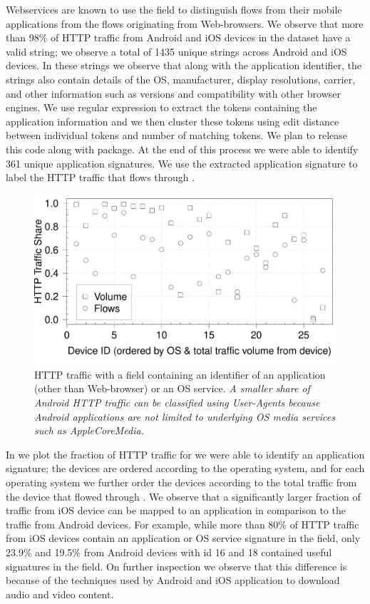 Webservices are known to use the \useragent field to distinguish flows from their mobile applications from the flows originating from Web-browsers.
We observe that more than 98\% of HTTP traffic from Android and iOS devices in the \mobWild dataset have a valid \useragent string; we observe a total of 1435 unique \useragent strings across Android and iOS devices. 
In these \useragent strings we observe that along with the application identifier, the \useragent strings also contain details of the OS, manufacturer, display resolutions, carrier, and other information such as versions and compatibility with other browser engines. 
We use regular expression to extract the tokens containing the application information and we then cluster these tokens using edit distance between individual tokens and number of matching tokens. 
We plan to release this code along with \platname package.
At the end of this process we were able to identify 361 unique application signatures.
We use the extracted application signature to label the HTTP traffic that flows through \platname.

\begin{figure}
\includegraphics[width=\columnwidth]{plots/appusage_someappsig_traffic.pdf}
\caption{HTTP traffic with a \useragent field containing an identifier of an application (other than Web-browser) or an OS service. 
\emph{A smaller share of Android HTTP traffic can be classified using User-Agents because Android applications are not limited to underlying OS media services such as AppleCoreMedia.}}
\label{fig:http-classification-app-user-agent}
\end{figure}

In  we plot the fraction of HTTP traffic for we were able to identify an application signature; the devices are ordered according to the operating system, and for each operating system we further order the devices according to the total traffic from the device that flowed through \platname. 
We observe that a significantly larger fraction of traffic from iOS device can be mapped to an application in comparison to the traffic from Android devices. 
For example, while more than 80\% of HTTP traffic from iOS devices contain an application or OS service signature in the \useragent field, only 23.9\% and 19.5\% from Android devices with id 16 and 18 contained useful signatures in the \useragent field.
On further inspection we observe that this difference is because of the techniques used by Android and iOS application to download audio and video content. 

